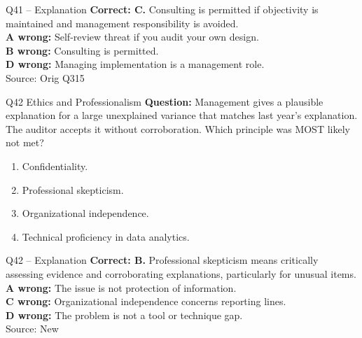 \documentclass[aspectratio=169,10pt]{beamer}
\begin{document}
\begin{frame}[t]{Q41 -- Explanation}
	\footnotesize
	\textbf{Correct: C.} Consulting is permitted if objectivity is maintained and management responsibility is avoided. \\[5pt]
\textbf{A wrong:} Self-review threat if you audit your own design. \\[3pt]
\textbf{B wrong:} Consulting is permitted. \\[3pt]
\textbf{D wrong:} Managing implementation is a management role. \\[3pt]
	\vfill {\tiny Source: Orig Q315}
\end{frame}

\begin{frame}[t]{Q42 \hfill {\scriptsize Ethics and Professionalism}}
	\small
	\textbf{Question:} Management gives a plausible explanation for a large unexplained variance that matches last year's explanation. The auditor accepts it without corroboration. Which principle was MOST likely not met?
	\begin{enumerate}[label=\Alph*.,itemsep=1pt,topsep=3pt]
			\item Confidentiality.
			\item Professional skepticism.
			\item Organizational independence.
			\item Technical proficiency in data analytics.
	\end{enumerate}
\end{frame}

\begin{frame}[t]{Q42 -- Explanation}
	\footnotesize
	\textbf{Correct: B.} Professional skepticism means critically assessing evidence and corroborating explanations, particularly for unusual items. \\[5pt]
\textbf{A wrong:} The issue is not protection of information. \\[3pt]
\textbf{C wrong:} Organizational independence concerns reporting lines. \\[3pt]
\textbf{D wrong:} The problem is not a tool or technique gap. \\[3pt]
	\vfill {\tiny Source: New}
\end{frame}
\end{document}
